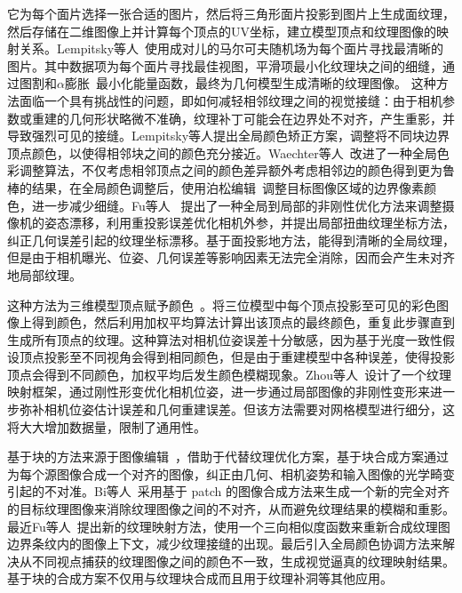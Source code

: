 \vspace*{2mm}它为每个面片选择一张合适的图片，然后将三角形面片投影到图片上生成面纹理，然后存储在二维图像上并计算每个顶点的UV坐标，建立模型顶点和纹理图像的映射关系。Lempitsky等人~\cite{lempitsky2007seamless}使用成对儿的马尔可夫随机场为每个面片寻找最清晰的图片。其中数据项为每个面片寻找最佳视图，平滑项最小化纹理块之间的细缝，通过图割和$\alpha$膨胀~\cite{boykov2001fast}最小化能量函数，最终为几何模型生成清晰的纹理图像。
这种方法面临一个具有挑战性的问题，即如何减轻相邻纹理之间的视觉接缝：由于相机参数或重建的几何形状略微不准确，纹理补丁可能会在边界处不对齐，产生重影，并导致强烈可见的接缝。Lempitsky等人提出全局颜色矫正方案，调整将不同块边界顶点颜色，以使得相邻块之间的颜色充分接近。Waechter等人~\cite{waechter2014let}改进了一种全局色彩调整算法，不仅考虑相邻顶点之间的颜色差异额外考虑相邻边的颜色得到更为鲁棒的结果，在全局颜色调整后，使用泊松编辑~\cite{PrezPatrick2003PoissonIE}调整目标图像区域的边界像素颜色，进一步减少细缝。Fu等人~\cite{fu2018texture} 提出了一种全局到局部的非刚性优化方法来调整摄像机的姿态漂移，利用重投影误差优化相机外参，并提出局部扭曲纹理坐标方法，纠正几何误差引起的纹理坐标漂移。基于面投影地方法，能得到清晰的全局纹理，但是由于相机曝光、位姿、几何误差等影响因素无法完全消除，因而会产生未对齐地局部纹理。\par
\vspace*{2mm}这种方法为三维模型顶点赋予颜色~\cite{franken2005minimizing,eisemann2008floating,dellepiane2011flow,wu20083d,aganj2010multi}。将三位模型中每个顶点投影至可见的彩色图像上得到颜色，然后利用加权平均算法计算出该顶点的最终颜色，重复此步骤直到生成所有顶点的纹理。这种算法对相机位姿误差十分敏感，因为基于光度一致性假设顶点投影至不同视角会得到相同颜色，但是由于重建模型中各种误差，使得投影顶点会得到不同颜色，加权平均后发生颜色模糊现象。Zhou等人~\cite{zhou2014color}设计了一个纹理映射框架，通过刚性形变优化相机位姿，进一步通过局部图像的非刚性变形来进一步弥补相机位姿估计误差和几何重建误差。但该方法需要对网格模型进行细分，这将大大增加数据量，限制了通用性。\par
\vspace*{2mm}基于块的方法来源于图像编辑~\cite{Barnes:2009:PAR}，借助于代替纹理优化方案，基于块合成方案通过为每个源图像合成一个对齐的图像，纠正由几何、相机姿势和输入图像的光学畸变引起的不对准。Bi等人~\cite{bi2017patch}采用基于 patch 的图像合成方法来生成一个新的完全对齐的目标纹理图像来消除纹理图像之间的不对齐，从而避免纹理结果的模糊和重影。最近Fu等人~\cite{fu2021seamless}提出新的纹理映射方法，使用一个三向相似度函数来重新合成纹理图边界条纹内的图像上下文，减少纹理接缝的出现。最后引入全局颜色协调方法来解决从不同视点捕获的纹理图像之间的颜色不一致，生成视觉逼真的纹理映射结果。基于块的合成方案不仅用与纹理块合成而且用于纹理补洞等其他应用。\par
